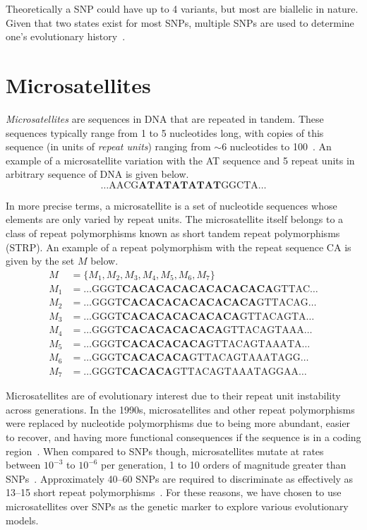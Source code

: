 Theoretically a SNP could have up to 4 variants, but most are biallelic in nature.
Given that two states exist for most SNPs, multiple SNPs are used to determine one's evolutionary
history~\cite{jehanSingleNucleotidePolymorphism2006}.

\section{Microsatellites}\label{sec:microsatellites}
\emph{Microsatellites} are sequences in DNA that are repeated in tandem.
These sequences typically range from 1 to 5 nucleotides long, with copies of this sequence (in units of
\emph{repeat units}) ranging from $\sim 6$ nucleotides to
100~\cite{roseThresholdSizeMicrosatellite1998,fanBriefReviewShort2007}.
An example of a microsatellite variation with the AT sequence and 5 repeat units in arbitrary
sequence of DNA is given below.
\begin{equation*}
     \ldots \text{AACG}\textbf{ATATATATAT}\text{GGCTA} \ldots
\end{equation*}

In more precise terms, a microsatellite is a set of nucleotide sequences whose elements are only varied by repeat units.
The microsatellite itself belongs to a class of repeat polymorphisms known as short tandem repeat polymorphisms (STRP).
An example of a repeat polymorphism with the repeat sequence CA is given by the set $M$ below.
\begin{align*}
    M &= \{ M_1, M_2, M_3, M_4, M_5, M_6, M_7 \} \\
    M_1 &= \ldots \text{GGGT}\textbf{CACACACACACACACACA}\text{GTTAC} \ldots \\
    M_2 &= \ldots \text{GGGT}\textbf{CACACACACACACACA}\text{GTTACAG} \ldots \\
    M_3 &= \ldots \text{GGGT}\textbf{CACACACACACACA}\text{GTTACAGTA} \ldots \\
    M_4 &= \ldots \text{GGGT}\textbf{CACACACACACA}\text{GTTACAGTAAA} \ldots \\
    M_5 &= \ldots \text{GGGT}\textbf{CACACACACA}\text{GTTACAGTAAATA} \ldots \\
    M_6 &= \ldots \text{GGGT}\textbf{CACACACA}\text{GTTACAGTAAATAGG} \ldots \\
    M_7 &= \ldots \text{GGGT}\textbf{CACACA}\text{GTTACAGTAAATAGGAA} \ldots
\end{align*}

Microsatellites are of evolutionary interest due to their repeat unit instability across generations.
In the 1990s, microsatellites and other repeat polymorphisms were replaced by nucleotide polymorphisms due to being
more abundant, easier to recover, and having more functional consequences if the sequence is in a coding
region~\cite{graySingleNucleotidePolymorphisms2000,butlerSTRsVsSNPs2007}.
When compared to SNPs though, microsatellites mutate at rates between $10^{-3}$ to $10^{-6}$ per generation,
1 to 10 orders of magnitude greater than SNPs~\cite{gemayelJunkVariableTandemRepeats2012}.
Approximately 40--60 SNPs are required to discriminate as effectively as 13--15 short repeat
polymorphisms~\cite{butlerSTRsVsSNPs2007}.
For these reasons, we have chosen to use microsatellites over SNPs as the genetic marker to explore various evolutionary
models.
